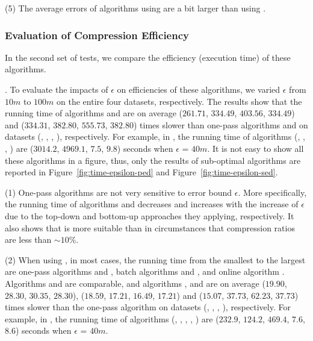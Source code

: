 \sstab (5) The average errors of algorithms using \sed are a bit larger than using \ped. 



\vspace{-1ex}
\subsubsection{Evaluation of Compression Efficiency}

In the second set of tests, we compare the efficiency (execution time) of these algorithms.


.
To evaluate the impacts of $\epsilon$ on efficiencies of these algorithms, we varied $\epsilon$ from $10m$ to $100m$ on the entire four datasets, respectively.
%
The results show that the running time of algorithms \optp and \nopts are on
average ($261.71$, $334.49$, $403.56$, $334.49$) and ($334.31$, $382.80$, $555.73$, $382.80$) times slower than one-pass algorithms \siped and \cised on datasets (\ucar, \geolife, \mopsi, \act), respectively. 
For example, in \mopsi, the running time of algorithms
(\optp, \nopts, \siped, \cised) are  {($3014.2$, $4969.1$, $7.5$, $9.8$)} seconds when $\epsilon$ = $40m$.
%
It is not easy to show all these algorithms in a figure, thus, only the results of sub-optimal algorithms are reported in Figure~\ref{fig:time-epsilon-ped} and Figure~\ref{fig:time-epsilon-sed}.

\sstab (1) One-pass algorithms are not very sensitive to error bound $\epsilon$. 
More specifically, the running time of algorithms \dpa and \tpa decreases and increases with the increase of $\epsilon$ due to the top-down and bottom-up approaches they applying, respectively. It also shows that \dpa is more suitable than \tpa in circumstances that compression ratios are less than $\sim 10\%$.

\sstab (2) When using \ped, in most cases, the running time from the smallest to the largest are one-pass algorithms \siped and \operb, batch algorithms \tpa and \dpa, and online algorithm \bqsa. 
Algorithms \siped and \operb are comparable, and algorithms \tpa, \dpa and \bqsa are on average
($19.90$, $28.30$, $30.35$, $28.30$), ($18.59$, $17.21$, $16.49$, $17.21$) and ($15.07$, $37.73$, $62.23$, $37.73$)
times slower than the one-pass algorithm \siped on datasets (\ucar, \geolife, \mopsi, \act), respectively.
% 
For example, in \mopsi, the running time of algorithms
(\tpa, \dpa, \bqsa, \siped, \operb ) are ($232.9$, $124.2$, $469.4$, $7.6$, $8.6$) seconds when $\epsilon$ = $40m$.

